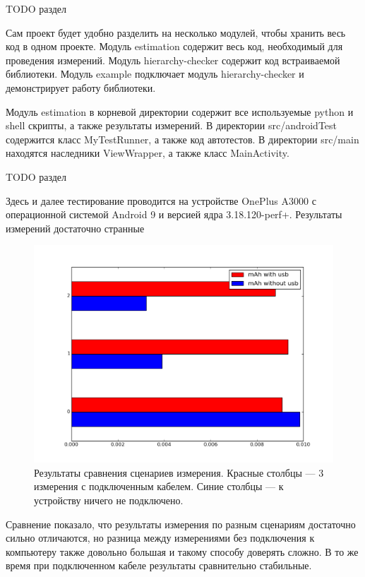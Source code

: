 \documentclass[a4paper,14pt]{extarticle} %
\begin{document}
	{\huge TODO раздел}
	
	Сам проект будет удобно разделить на несколько модулей, чтобы хранить весь код в одном проекте. Модуль estimation содержит весь код, необходимый для проведения измерений. Модуль hierarchy-checker содержит код встраиваемой библиотеки. Модуль example подключает модуль hierarchy-checker и демонстрирует работу библиотеки.
	
	Модуль estimation в корневой директории содержит все используемые python и shell скрипты, а также результаты измерений. В директории src/androidTest содержится класс MyTestRunner, а также код автотестов. В директории src/main находятся наследники ViewWrapper, а также класс MainActivity.
	
	{\huge TODO раздел}
	
	Здесь и далее тестирование проводится на устройстве OnePlus A3000 с операционной системой Android 9 и версией ядра 3.18.120-perf+. Результаты измерений достаточно странные~\ris{\ref{fig:usb_comparation}}
	
	\begin{figure}[tbh]
		\includegraphics[width=\textwidth]{usb_comparation}
		\caption{Результаты сравнения  сценариев измерения. Красные столбцы --- 3 измерения с подключенным кабелем. Синие столбцы --- к устройству ничего не подключено.}
		\label{fig:usb_comparation}
	\end{figure}

	Сравнение показало, что результаты измерения по разным сценариям достаточно сильно отличаются, но разница между измерениями без подключения к компьютеру также довольно большая и такому способу доверять сложно. В то же время при подключенном кабеле результаты сравнительно стабильные.
	
\end{document}
